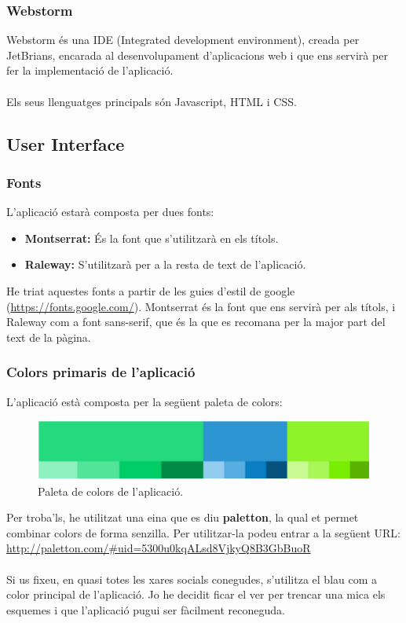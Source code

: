 \documentclass[11pt,catalan,listoffigures,listoftables]{tfgetsinf}
\begin{document}
\begin{itemize}
\end{itemize}

\subsubsection{Webstorm}

Webstorm és una IDE (Integrated development environment), creada per JetBrians, encarada al desenvolupament d'aplicacions web i que ens servirà per fer la implementació de l'aplicació.\\ \\
Els seus llenguatges principals són Javascript, HTML i CSS.

\subsection{User Interface}

\subsubsection{Fonts}

L'aplicació estarà composta per dues fonts:
\begin{itemize}
\item \textbf{Montserrat:} És la font que s'utilitzarà en els títols.
\item \textbf{Raleway:} S'utilitzarà per a la resta de text de l'aplicació.
\end{itemize}
He triat aquestes fonts a partir de les guies d'estil de google (\url{https://fonts.google.com/}). Montserrat és la font que ens servirà per als títols, i Raleway com a font sans-serif, que és la que es recomana per la major part del text de la pàgina.

\subsubsection{Colors primaris de l'aplicació}

L'aplicació està composta per la següent paleta de colors:

\begin{figure}[h]
\includegraphics[width=12cm]{images/image1}
\centering
\caption[Figura 4.2]{Paleta de colors de l'aplicació.}
\centering
\end{figure}
\noindent Per troba'ls, he utilitzat una eina que es diu \textbf{paletton}, la qual et permet combinar colors de forma senzilla. Per utilitzar-la podeu entrar a la següent URL:\\
\url{http://paletton.com/\#uid=5300u0kqALsd8VjkyQ8B3GbBuoR} \\ \\
Si us fixeu, en quasi totes les xares socials conegudes, s'utilitza el blau com a color principal de l'aplicació. Jo he decidit ficar el ver per trencar una mica els esquemes i que l'aplicació pugui ser fàcilment reconeguda.
\end{document}
